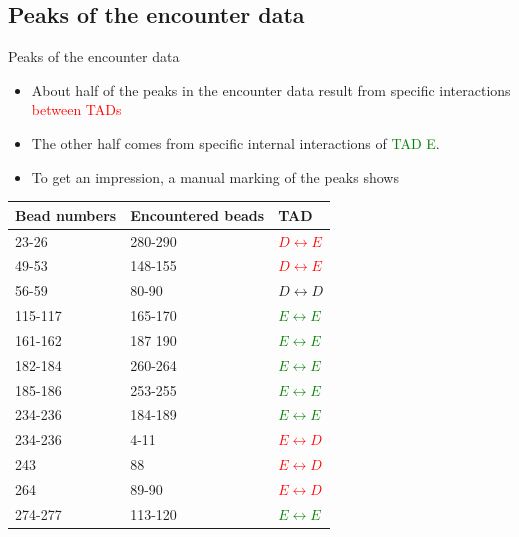 \documentclass[8pt]{beamer}
\begin{document}
\subsection{Peaks of the encounter data}
\begin{frame}{Peaks of the encounter data}
\begin{itemize}
\item About half of the peaks in the encounter data result from specific interactions \textcolor{red}{between TADs}
\item The other half comes from specific internal interactions of \textcolor{green}{TAD E}.
\item To get an impression, a manual marking of the peaks shows 
\end{itemize}
\begin{table}[H]\label{nonNeighborBeadEncounterTable}
\begin{tabular}{l l l}
Bead numbers & Encountered beads & TAD\\
\hline
23-26   & 280-290 & \textcolor{red}{$D\leftrightarrow E$}\\
49-53   & 148-155 & \textcolor{red}{$D\leftrightarrow E$}\\
56-59   & 80-90   & $D\leftrightarrow D$\\
115-117 & 165-170 & \textcolor{green}{$E\leftrightarrow E$}\\
161-162 & 187 190 & \textcolor{green}{$E\leftrightarrow E$}\\
182-184 & 260-264 & \textcolor{green}{$E\leftrightarrow E$}\\
185-186 & 253-255 & \textcolor{green}{$E\leftrightarrow E$}\\
234-236 & 184-189 & \textcolor{green}{$E\leftrightarrow E$}\\
234-236 & 4-11    & \textcolor{red}{$E\leftrightarrow D$}\\
243     & 88      & \textcolor{red}{$E\leftrightarrow D$}\\
264     & 89-90   & \textcolor{red}{$E\leftrightarrow D$}\\
274-277 & 113-120 & \textcolor{green}{$E\leftrightarrow E$}
\end{tabular}
\end{table} 
\end{frame}
\end{document}
